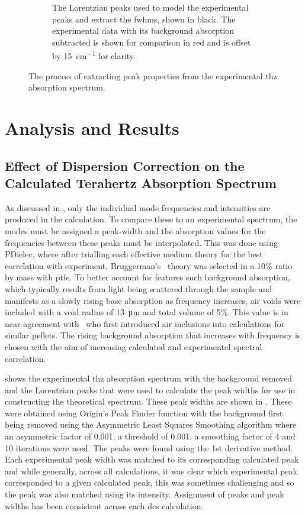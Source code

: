 \begin{figure}
\begin{subfigure}{1\textwidth}
    \caption{The Lorentzian peaks used to model the experimental peaks and extract the \acrshort{fwhm}s, shown in black. The experimental data with its background absorption subtracted is shown for comparison in red and is offset by \SI{15}{cm^{-1}} for clarity.}
    \label{fig:aLM_abs_lorentz}
\end{subfigure}
\captionsetup{font = footnotesize, justification = centering}
\caption[Extraction of Experimental Peak Widths]{The process of extracting peak properties from the experimental \acrshort{thz} absorption spectrum.}
\label{fig:peak_widths}
\end{figure}

\section{Analysis and Results}
\subsection{Effect of Dispersion Correction on the Calculated Terahertz Absorption Spectrum}
\label{subsec:ch4_spectra}
As discussed in , only the individual mode frequencies and intensities are produced in the calculation. To compare these to an experimental spectrum, the modes must be assigned a peak\nobreakdash-width and the absorption values for the frequencies between these peaks must be interpolated. This was done using PDielec, where after trialling each effective medium theory for the best correlation with experiment, Bruggerman's~\cite{Bruggeman1935} theory was selected in a 10\% ratio by mass with \acrshort{ptfe}. To better account for features such background absorption, which typically results from light being scattered through the sample and manifests as a slowly rising base absorption as frequency increases, air voids were included with a void radius of \SI{13}{\micro\metre} and total volume of 5\%. This value is in near agreement with~\cite{Parrott2009} who first introduced air inclusions into calculations for similar pellets. The rising background absorption that increases with frequency is chosen with the aim of increasing calculated and experimental spectral correlation.

 shows the experimental \acrshort{thz} absorption spectrum with the background removed and the Lorentzian peaks that were used to calculate the peak widths for use in constructing the theoretical spectrum. These peak widths are shown in . These were obtained using Origin's Peak Finder function with the background first being removed using the Asymmetric Least Squares Smoothing algorithm where an asymmetric factor of 0.001, a threshold of 0.001, a smoothing factor of 4 and 10 iterations were used. The peaks were found using the 1st derivative method. Each experimental peak width was matched to its corresponding calculated peak and while generally, across all calculations, it was clear which experimental peak corresponded to a given calculated peak, this was sometimes challenging and so the peak was also matched using its intensity. Assignment of peaks and peak widths has been consistent across each \acrshort{dc}s calculation. 

